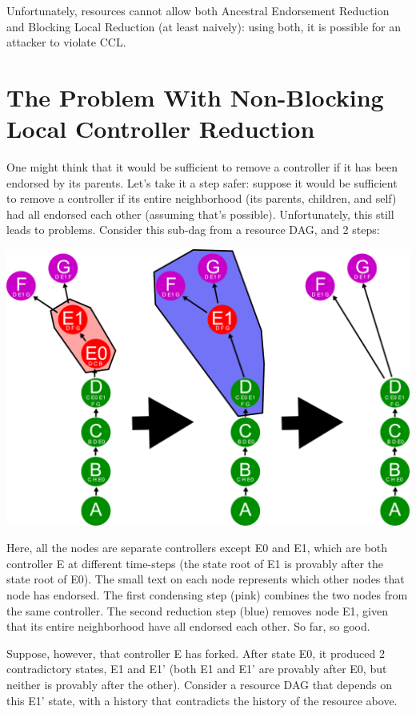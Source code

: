 \documentclass[a4paper,USenglish,cleveref, autoref, thm-restate, anonymous]{lipics-v2021}
\begin{document}
Unfortunately, resources cannot allow both Ancestral Endorsement Reduction and Blocking Local Reduction (at least naively): using both, it is possible for an attacker to violate CCL.

\section{The Problem With Non-Blocking Local Controller Reduction}
\label{sec:nonblockingproblem}
One might think that it would be sufficient to remove a controller if it has been endorsed by its parents.
Let's take it a step safer:
suppose it would be sufficient to remove a controller if its entire neighborhood (its parents, children, and self) had all endorsed each other (assuming that's possible). 
Unfortunately, this still leads to problems. 
Consider this sub-dag from a resource DAG, and 2  steps:

\includegraphics[width=1\linewidth]{figs/local-reduce-example-red-1.pdf}

Here, all the nodes are separate controllers except E0 and E1, which are both controller E at different time-steps (the state root of E1 is provably after the state root of E0). 
The small text on each node represents which other nodes that node has endorsed. 
The first condensing step (pink) combines the two nodes from the same controller. 
The second reduction step (blue) removes node E1, given that its entire neighborhood have all endorsed each other. 
So far, so good.

Suppose, however, that controller E has forked.
After state E0, it produced 2 contradictory states, E1 and E1' (both E1 and E1' are provably after E0, but neither is provably after the other). 
Consider a resource DAG that depends on this E1' state, with a history that contradicts the history of the resource above. 
\end{document}
